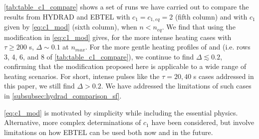 \documentclass[iop]{emulateapj}
\begin{document}
	\par\autoref{tab:table_c1_compare} shows a set of runs we have carried out to compare the results from HYDRAD and EBTEL with $c_1=c_{1,eq}=2$ (fifth column) and with $c_1$ given by \autoref{eq:c1_mod} (sixth column), when $n<n_{eq}$. We find that using the modification in \autoref{eq:c1_mod} gives, for the more intense heating cases with $\tau\ge200$ s, $\Delta\sim0.1$ at $n_{max}$. For the more gentle heating profiles of \citet{cargill_enthalpy-based_2012} and \citet{bradshaw_influence_2013} (i.e. rows 3, 4, 6, and 8 of \autoref{tab:table_c1_compare}), we continue to find $\Delta\lesssim0.2$, confirming that the modification proposed here is applicable to a wide range of heating scenarios. For short, intense pulses like the $\tau=20,40$ s cases addressed in this paper, we still find $\Delta>0.2$. We have addressed the limitations of such cases in \autoref{subsubsec:hydrad_comparison_sf}.
	
	\par\autoref{eq:c1_mod} is motivated by simplicity while including the essential physics. Alternative, more complex determinations of $c_1$ have been considered, but involve limitations on how EBTEL can be used both now and in the future.
\end{document}

